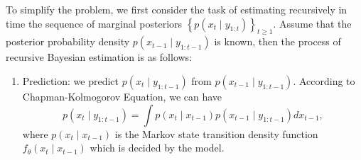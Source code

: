 \documentclass[mstat,12pt]{unswthesis}  %
\numberwithin{equation}{section}
\begin{document}
\noindent To simplify the problem, we first consider
the task of estimating recursively
in time the sequence of marginal posteriors 
$\left\{p\left(x_{t} \mid y_{1: t}\right)\right\}_{t \geq 1}$.
Assume that the posterior probability density
$p\left(x_{t-1} \mid y_{1:t-1}\right)$ is known, then
the process of recursive Bayesian estimation is as follows:\\
\begin{enumerate}
    \item Prediction: we predict $p\left(x_{t} \mid y_{1:t-1}\right)$ from $p\left(x_{t-1} \mid y_{1:t-1}\right)$. 
    According to Chapman-Kolmogorov Equation, we can have
    \begin{equation}\label{Prediction}
        p\left(x_{t} \mid y_{1:t-1}\right)=\int p\left(x_{t} \mid x_{t-1}\right) p\left(x_{t-1} \mid y_{1:t-1}\right) d x_{t-1},
    \end{equation}
    where $p\left(x_{t} \mid x_{t-1}\right)$ is
    the Markov state transition density function $f_{\theta}\left(x_{t} \mid x_{t-1}\right)$ which is decided
    by the model.\\
    

\end{enumerate}
\end{document}
